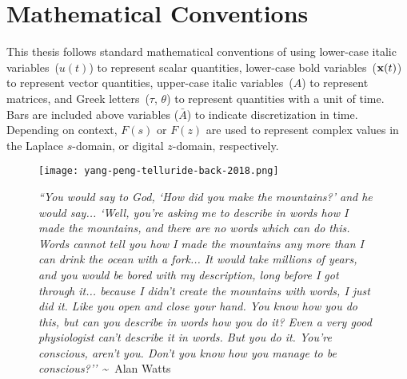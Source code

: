 \cleardoublepage
{}
\renewcommand\contentsname{Table of Contents}
\tableofcontents
\cleardoublepage
{}

\iffalse
\addcontentsline{toc}{chapter}{List of Todos}
\listoftodos
\cleardoublepage
\phantomsection
\fi

\listoftables
\cleardoublepage
{}

\listoffigures
\cleardoublepage
{}

\listoftheorems[ignoreall,show={theorem,lemma}]
\cleardoublepage
{}

\chapter*{Mathematical Conventions}
\label{typography}

This thesis follows standard mathematical conventions of using lower-case italic variables~($u(t)$) to represent scalar quantities, lower-case bold variables~($\mathbf{x}(t)$) to represent vector quantities, upper-case italic variables~($A$) to represent matrices, and Greek letters~($\tau$, $\theta$) to represent quantities with a unit of time.
Bars are included above variables ($\bar{A}$) to indicate discretization in time.
Depending on context, $F(s)$ or $F(z)$ are used to represent complex values in the Laplace $s$-domain, or digital $z$-domain, respectively.

\cleardoublepage
{}

\begin{figure}
\centering
\vspace*{\fill}
\begingroup
\texttt{[image: yang-peng-telluride-back-2018.png]}
\endgroup

\vspace{1em} 

\caption*{{\tiny \emph{``You would say to God, `How did you make the mountains?' and he would say... `Well, you're asking me to describe in words how I made the mountains, and there are no words which can do this. Words cannot tell you how I made the mountains any more than I can drink the ocean with a fork... It would take millions of years, and you would be bored with my description, long before I got through it... because I didn't create the mountains with words, I just did it. Like you open and close your hand. You know how you do this, but can you describe in words how you do it? Even a very good physiologist can't describe it in words. But you do it. You're conscious, aren't you. Don't you know how you manage to be conscious?''}~\textasciitilde~Alan Watts}}

\vspace*{\fill}
\end{figure}

\cleardoublepage
{}

